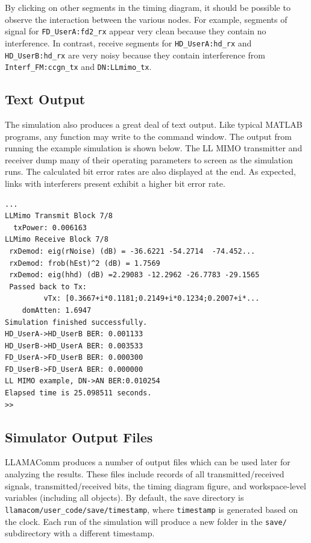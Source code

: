 By clicking on other segments in the timing diagram, it should be
possible to observe the interaction between the various nodes.  For
example, segments of signal for \verb+FD_UserA:fd2_rx+ appear very
clean because they contain no interference.  In contrast, receive
segments for \verb+HD_UserA:hd_rx+ and \verb+HD_UserB:hd_rx+ are
very noisy because they contain interference from
\verb+Interf_FM:ccgn_tx+ and \verb+DN:LLmimo_tx+.

\subsection{Text Output}

The simulation also produces a great deal of text output.  Like
typical MATLAB programs, any function may write to the command
window.  The output from running the example simulation is shown
below. The LL MIMO transmitter and receiver dump many of their
operating parameters to screen as the simulation runs.  The
calculated bit error rates are also displayed at the end.  As
expected, links with interferers present exhibit a higher bit error
rate.

\begin{lstlisting}[name=output,numbers=none]
 ...
LLMimo Transmit Block 7/8
  txPower: 0.006163
LLMimo Receive Block 7/8
 rxDemod: eig(rNoise) (dB) = -36.6221 -54.2714  -74.452...
 rxDemod: frob(hEst)^2 (dB) = 1.7569
 rxDemod: eig(hhd) (dB) =2.29083 -12.2962 -26.7783 -29.1565
 Passed back to Tx:
         vTx: [0.3667+i*0.1181;0.2149+i*0.1234;0.2007+i*...
    domAtten: 1.6947
Simulation finished successfully.
HD_UserA->HD_UserB BER: 0.001133
HD_UserB->HD_UserA BER: 0.003533
FD_UserA->FD_UserB BER: 0.000300
FD_UserB->FD_UserA BER: 0.000000
LL MIMO example, DN->AN BER:0.010254
Elapsed time is 25.098511 seconds.
>>
\end{lstlisting}

\subsection{Simulator Output Files} \label{sec:simOutputFiles}

LLAMAComm produces a number of output files which can be used later
for analyzing the results.  These files include records of all
transmitted/received signals, transmitted/received bits, the timing
diagram figure, and workspace-level variables (including all
objects).  By default, the save directory is
\verb+llamacom/user_code/save/timestamp+, where \verb+timestamp+ is generated
based on the clock.  Each run of the simulation will produce a new
folder in the \verb+save/+ subdirectory with a different timestamp.

